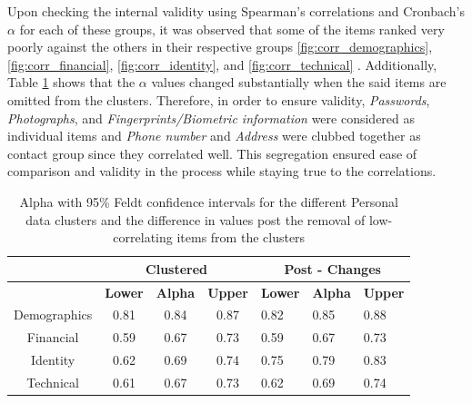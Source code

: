 Upon checking the internal validity using Spearman's correlations and Cronbach's $\alpha$ for each of these groups, it was observed that some of the items ranked very poorly against the others in their respective groups  \ref{fig:corr_demographics}, \ref{fig:corr_financial}, \ref{fig:corr_identity}, and \ref{fig:corr_technical} .  Additionally, Table \ref{tab:Personal data_clustered_alpha} shows that the $\alpha$ values changed substantially when the said items are omitted from the clusters. Therefore, in order to ensure validity, \textit{Passwords}, \textit{Photographs}, and \textit{Fingerprints/Biometric information} were considered as individual items and \textit{Phone number} and \textit{Address} were clubbed together as contact group since they correlated well. This segregation ensured ease of comparison and validity in the process while staying true to the correlations.

\begin{table}[htbp]
    \centering
    \begin{tabular}{|c|c|c|c|l|l|l|}\hline
 & \multicolumn{3}{|c|}{Clustered} & \multicolumn{3}{|c|}{Post - Changes}\\\hline
         &  \textbf{Lower}& \textbf{Alpha}& \textbf{Upper} & \textbf{Lower}& \textbf{Alpha}& \textbf{Upper} \\\hline
         Demographics&  0.81&  0.84& 0.87 & 0.82& 0.85& 0.88\\\hline
         Financial&  0.59&  0.67& 0.73 & 0.59& 0.67& 0.73\\\hline
         Identity&  0.62&  0.69& 0.74 & 0.75& 0.79& 0.83\\\hline
         Technical& 0.61& 0.67& 0.73 & 0.62& 0.69& 0.74\\\hline\hline
    \end{tabular}
    \caption{Alpha with 95\% Feldt confidence intervals for the different Personal data clusters and the difference in values post the removal of low-correlating items from the clusters}
    \label{tab:Personal data_clustered_alpha}
\end{table}


